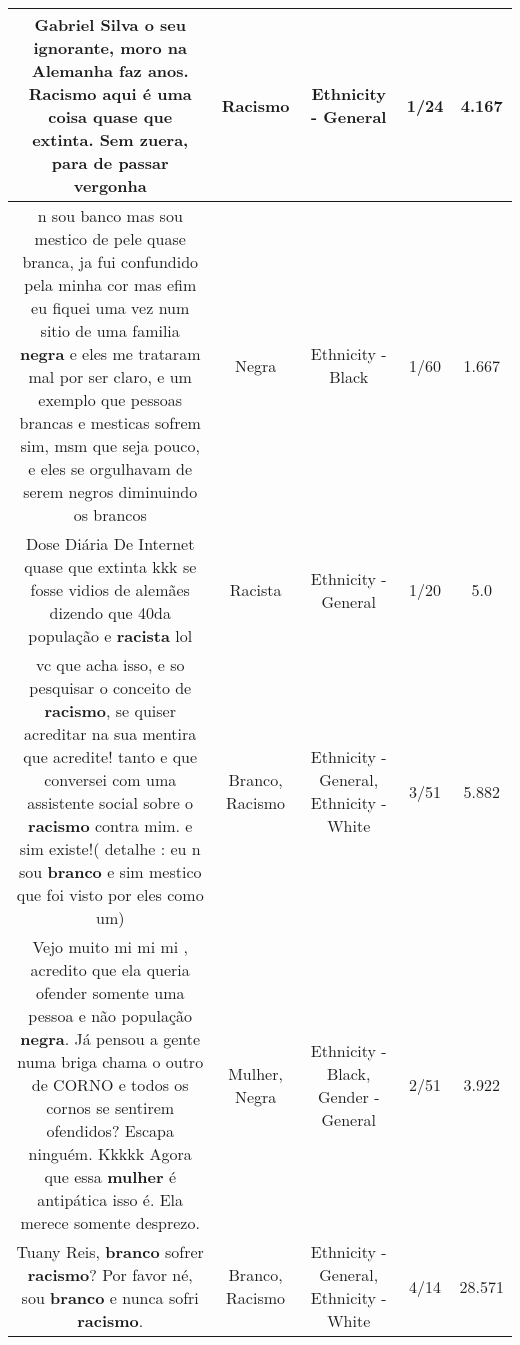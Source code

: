 \documentclass[11pt]{article}
\newlength\mylength
\begin{document}
\begin{center}
\begin{longtable}{|C{.65\mylength}|C{.30\mylength}|C{.12\mylength}|C{.12\mylength}|C{.12\mylength}|}
  \small Gabriel Silva o seu ignorante, moro na Alemanha faz anos. \textbf{Racismo} aqui é uma coisa quase que extinta. Sem zuera, para de passar vergonha\normalsize   & Racismo & Ethnicity - General & 1/24 & 4.167 \\  \hline
  \small n sou banco mas sou mestico de pele quase branca, ja fui confundido pela minha cor mas efim eu fiquei uma vez num sitio de uma familia \textbf{negra} e eles me trataram mal por ser claro, e um exemplo que pessoas brancas e mesticas sofrem sim, msm que seja pouco, e eles se orgulhavam de serem negros diminuindo os brancos\normalsize   & Negra & Ethnicity - Black & 1/60 & 1.667 \\  \hline
  \small Dose Diária De Internet quase que extinta kkk se fosse vidios de alemães dizendo que 40da população e \textbf{racista} lol\normalsize   & Racista & Ethnicity - General & 1/20 & 5.0 \\  \hline
  \small vc que acha isso, e so pesquisar o conceito de \textbf{racismo}, se quiser acreditar na sua mentira que acredite! tanto e que conversei com uma assistente social sobre o \textbf{racismo} contra mim. e sim existe!( detalhe : eu n sou \textbf{branco} e sim mestico que foi visto por eles como um)\normalsize   & Branco, Racismo & Ethnicity - General, Ethnicity - White & 3/51 & 5.882 \\  \hline
  \small Vejo muito mi mi mi , acredito que ela queria ofender somente uma pessoa e não população \textbf{negra}. Já pensou a gente numa briga chama o outro de CORNO e todos os cornos se sentirem ofendidos? Escapa ninguém. Kkkkk Agora que essa \textbf{mulher} é antipática isso é. Ela merece somente desprezo.\normalsize   & Mulher, Negra & Ethnicity - Black, Gender - General & 2/51 & 3.922 \\  \hline
  \small Tuany Reis, \textbf{branco} sofrer \textbf{racismo}? Por favor né, sou \textbf{branco} e nunca sofri \textbf{racismo}.\normalsize   & Branco, Racismo & Ethnicity - General, Ethnicity - White & 4/14 & 28.571 \\  \hline

\end{longtable}
\end{center}
\end{document}

